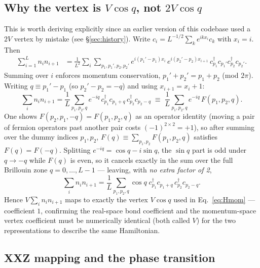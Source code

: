 \documentclass[11pt]{article}
\begin{document}
\subsection{Why the vertex is $V\cos q$, not $2V\cos q$}
\label{sec:derivation}

This is worth deriving explicitly since an earlier version of this codebase
used a $2V$ vertex by mistake (see \S\ref{sec:history}). Write
$c_i = L^{-1/2}\sum_k e^{ikx_i}c_k$ with $x_i=i$. Then
\begin{align}
\sum_{i=1}^{L} n_i n_{i+1}
&= \frac{1}{L^2}\sum_{i}\sum_{p_1,p_1',p_2,p_2'}
   e^{i(p_1'-p_1)x_i}\,e^{i(p_2'-p_2)x_{i+1}}\,
   c_{p_1}^\dagger c_{p_1'} c_{p_2}^\dagger c_{p_2'}.
\end{align}
Summing over $i$ enforces momentum conservation, $p_1'+p_2'=p_1+p_2$
(mod $2\pi$). Writing $q \equiv p_1'-p_1$ (so $p_2'-p_2=-q$) and using
$x_{i+1}=x_i+1$:
\begin{equation}
\sum_i n_i n_{i+1} = \frac{1}{L}\sum_{p_1,p_2,q} e^{-iq}\,
   c_{p_1}^\dagger c_{p_1+q}\, c_{p_2}^\dagger c_{p_2-q}
   \;\equiv\; \frac{1}{L}\sum_{p_1,p_2,q} e^{-iq}\, F(p_1,p_2,q).
\end{equation}
One shows $F(p_2,p_1,-q) = F(p_1,p_2,q)$ as an operator identity (moving a
pair of fermion operators past another pair costs $(-1)^{2\times2}=+1$), so
after summing over the dummy indices $p_1,p_2$, $F(q)\equiv\sum_{p_1,p_2}
F(p_1,p_2,q)$ satisfies $F(q)=F(-q)$. Splitting $e^{-iq}=\cos q - i\sin q$,
the $\sin q$ part is odd under $q\to-q$ while $F(q)$ is even, so it cancels
exactly in the sum over the full Brillouin zone $q=0,\dots,L-1$ — leaving,
with \emph{no extra factor of 2},
\begin{equation}
\sum_i n_i n_{i+1} = \frac{1}{L}\sum_{p_1,p_2,q} \cos q\;
   c_{p_1}^\dagger c_{p_1+q}\, c_{p_2}^\dagger c_{p_2-q}.
\end{equation}
Hence $V\sum_i n_in_{i+1}$ maps to exactly the vertex $V\cos q$ used in
Eq.~\eqref{eq:Hmom} — coefficient $1$, confirming the real-space bond
coefficient and the momentum-space vertex coefficient must be numerically
identical (both called $V$) for the two representations to describe the
same Hamiltonian.

\subsection{XXZ mapping and the phase transition}
\end{document}
